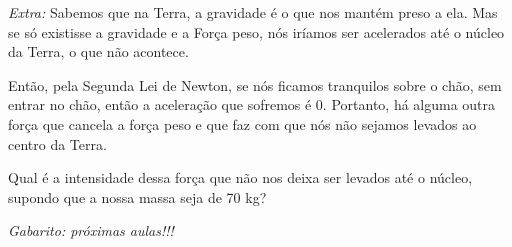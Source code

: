 \documentclass[12pt]{extarticle}
\newcommand{\<}{\langle}
\renewcommand{\>}{\rangle}
\theoremstyle{definition}
\begin{document}
\textit{Extra:} Sabemos que na Terra, a gravidade é o que nos mantém preso a ela. Mas se só existisse a gravidade e a Força peso, nós iríamos ser acelerados até o núcleo da Terra, o que não acontece. 

Então, pela Segunda Lei de Newton, se nós ficamos tranquilos sobre o chão, sem entrar no chão, então a aceleração que sofremos é 0. Portanto, há alguma outra força que cancela a força peso e que faz com que nós não sejamos levados ao centro da Terra. 

Qual é a intensidade dessa força que não nos deixa ser levados até o núcleo, supondo que a nossa massa seja de 70 kg?

\textit{Gabarito: próximas aulas!!!}
\end{document}
